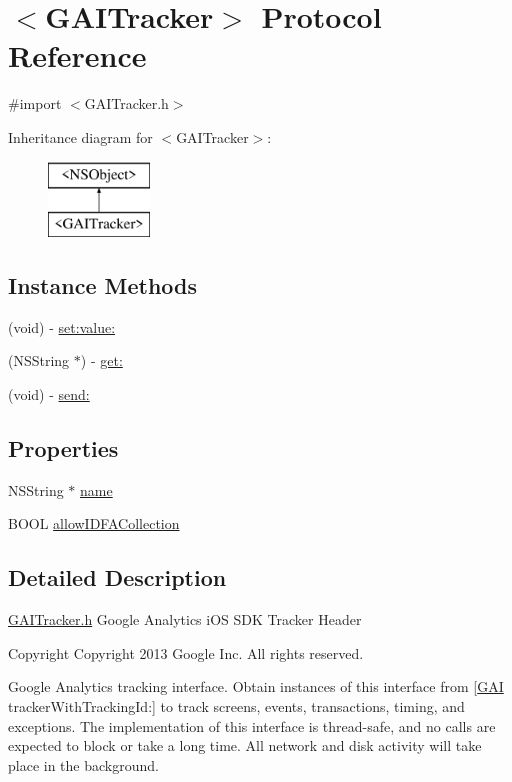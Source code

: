 \hypertarget{protocol_g_a_i_tracker-p}{}\section{$<$G\+A\+I\+Tracker$>$ Protocol Reference}
\label{protocol_g_a_i_tracker-p}


{\ttfamily \#import $<$G\+A\+I\+Tracker.\+h$>$}

Inheritance diagram for $<$G\+A\+I\+Tracker$>$\+:\begin{figure}[H]
\begin{center}
\leavevmode
\includegraphics[height=2.000000cm]{protocol_g_a_i_tracker-p}
\end{center}
\end{figure}
\subsection*{Instance Methods}
\begin{DoxyCompactItemize}
\item 
(void) -\/ \hyperlink{protocol_g_a_i_tracker-p_aa96612a73d5adf1e0092246de248716e}{set\+:value\+:}
\item 
(N\+S\+String $\ast$) -\/ \hyperlink{protocol_g_a_i_tracker-p_aa5fb31f74edfc74533cd3f6a12f7bb46}{get\+:}
\item 
(void) -\/ \hyperlink{protocol_g_a_i_tracker-p_ae200c9432a91242cf4e1e4917f353c14}{send\+:}
\end{DoxyCompactItemize}
\subsection*{Properties}
\begin{DoxyCompactItemize}
\item 
N\+S\+String $\ast$ \hyperlink{protocol_g_a_i_tracker-p_a83fe089d882610176701a2f77e884d3c}{name}
\item 
B\+O\+OL \hyperlink{protocol_g_a_i_tracker-p_a0743d4e30b788e75ea3662b64f211153}{allow\+I\+D\+F\+A\+Collection}
\end{DoxyCompactItemize}


\subsection{Detailed Description}
\hyperlink{_g_a_i_tracker_8h}{G\+A\+I\+Tracker.\+h}  Google Analytics i\+OS S\+DK Tracker Header \begin{DoxyCopyright}{Copyright}
Copyright 2013 Google Inc. All rights reserved.
\end{DoxyCopyright}
Google Analytics tracking interface. Obtain instances of this interface from \mbox{[}\hyperlink{interface_g_a_i}{G\+AI} tracker\+With\+Tracking\+Id\+:\mbox{]} to track screens, events, transactions, timing, and exceptions. The implementation of this interface is thread-\/safe, and no calls are expected to block or take a long time. All network and disk activity will take place in the background. 

